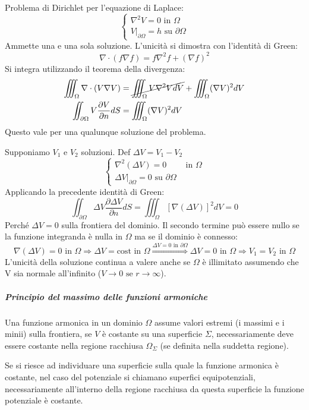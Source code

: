 Problema di Dirichlet per l'equazione di Laplace:
$$
\begin{cases}
\nabla^2 V = 0 \text{ in } \Omega\\
\left.V\right|_{\partial\Omega} = h \text{ su } \partial\Omega
\end{cases}
$$
Ammette una e una sola soluzione.
L'unicità si dimostra con l'identità di Green:
$$
\nabla\cdot(f\nabla f) = f\nabla^2f + (\nabla f)^2
$$
Si integra utilizzando il teorema della divergenza:
$$
\begin{aligned}
\iiint_\Omega \nabla\cdot(V\nabla V) &= \cancel{\iiint_\Omega V\nabla^2 V dV} + \iiint_\Omega (\nabla V)^2 dV\\
\iint_{\partial\Omega} V \frac{\partial V}{\partial n}dS &= \iiint_\Omega (\nabla V)^2 dV
\end{aligned}
$$
Questo vale per una qualunque soluzione del problema.

Supponiamo $V_1$ e $V_2$ soluzioni. Def $\Delta V = V_1 - V_2$ 
$$
\begin{cases}
\nabla^2 (\Delta V) = 0 & \text{ in }\Omega \\
\left.\Delta V\right|_{\partial \Omega} = 0 \text{ su } \partial \Omega
\end{cases}
$$
Applicando la precedente identità di Green:
$$
\iint_{\partial \Omega} \Delta V \frac{\partial \Delta V}{\partial n} dS =
\iiint_\Omega \left[\nabla(\Delta V)\right]^2 dV = 0
$$
Perché $\Delta V = 0$ sulla frontiera del dominio.
Il secondo termine può essere nullo se la funzione integranda è nulla in $\Omega$ ma se il dominio
è connesso:
$$
\nabla(\Delta V) = 0 \text{ in } \Omega \Rightarrow \Delta V = \text{cost in } \Omega \stackrel{\Delta V = 0 \text{ in }\partial\Omega}{\Rightarrow}
\Delta V = 0 \text{ in } \Omega \Rightarrow V_1 = V_2 \text{ in } \Omega
$$
L'unicità della soluzione continua a valere anche se $\Omega$ è illimitato assumendo che V sia 
normale all'infinito ($V \to 0 \text{ se } r \to \infty$).

\subparagraph{Principio del massimo delle funzioni armoniche}
Una funzione armonica in un dominio $\Omega$ assume valori estremi (i massimi e i minii) sulla
frontiera, se $V$ è costante su una superficie $\Sigma$, necessariamente deve essere costante
nella regione racchiusa $\Omega_\Sigma$ (se definita nella suddetta regione).

Se si riesce ad individuare una superficie sulla quale la funzione armonica è costante, nel caso
del potenziale si chiamano superfici equipotenziali, necessariamente all'interno della regione
racchiusa da questa superficie la funzione potenziale è costante.

